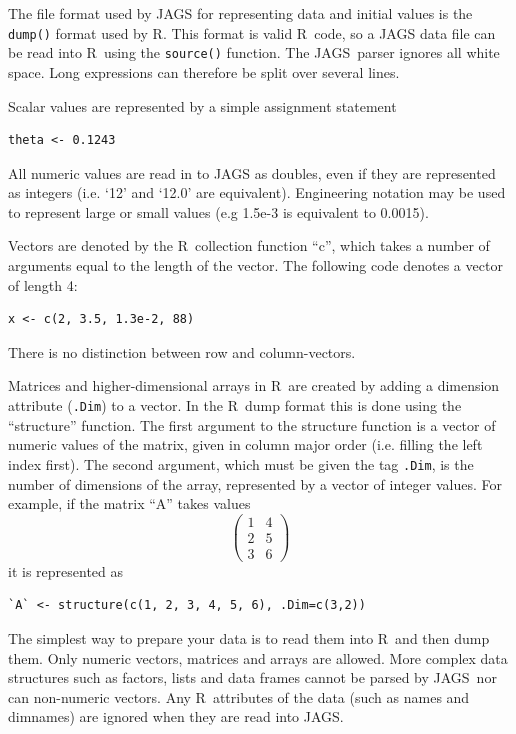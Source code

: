 \documentclass[11pt, a4paper, titlepage]{report}
\newcommand{\JAGS}{\textsf{JAGS}}
\newcommand{\R}{\textsf{R}}
\begin{document}
The file format used by JAGS for representing data and initial values
is the \verb+dump()+ format used by \R.  This format is valid \R\ code,
so a JAGS data file can be read into \R\ using the \verb+source()+ function.
The \JAGS\ parser ignores all white space.  Long expressions can
therefore be split over several lines.

Scalar values are represented by a simple assignment statement 
\begin{verbatim}
theta <- 0.1243
\end{verbatim}
All numeric values are read in to JAGS as doubles, even if they are
represented as integers (i.e. `12' and `12.0' are
equivalent). Engineering notation may be used to represent large or
small values (e.g 1.5e-3 is equivalent to 0.0015).

Vectors are denoted by the \R\ collection function ``c'', which takes
a number of arguments equal to the length of the vector.  The
following code denotes a vector of length 4:
\begin{verbatim}
x <- c(2, 3.5, 1.3e-2, 88)
\end{verbatim}
There is no distinction between row and column-vectors. 

Matrices and higher-dimensional arrays in \R\ are created by adding a
dimension attribute (\verb+.Dim+) to a vector. In the \R\ dump format
this is done using the ``structure'' function.  The first argument to
the structure function is a vector of numeric values of the matrix,
given in column major order (i.e. filling the left index first). The
second argument, which must be given the tag \verb+.Dim+, is the
number of dimensions of the array, represented by a vector of integer
values. For example, if the matrix ``A'' takes values
\[
\left(
\begin{array}{cc}
  1 & 4 \\
  2 & 5 \\
  3 & 6 
\end{array}
\right)
\]
it is represented as
\begin{verbatim}
`A` <- structure(c(1, 2, 3, 4, 5, 6), .Dim=c(3,2))
\end{verbatim}

The simplest way to prepare your data is to read them into \R\ and
then dump them.  Only numeric vectors, matrices and arrays are
allowed. More complex data structures such as factors, lists and data
frames cannot be parsed by \JAGS\, nor can non-numeric vectors.  Any
\R\ attributes of the data (such as names and dimnames) are ignored
when they are read into \JAGS. 
\end{document}
